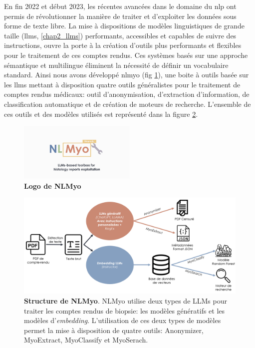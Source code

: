 En fin 2022 et début 2023, les récentes avancées dans le domaine du \gls{nlp} ont permis de révolutionner la manière de traiter et d'exploiter les données sous forme de texte libre. La mise à dispositions de modèles linguistiques de grande taille (\gls{llms}, \ref{chap2_llms}) performants, accessibles et capables de suivre des instructions, ouvre la porte à la création d'outils plus performants et flexibles pour le traitement de ces comptes rendus. Ces systèmes basés sur une approche sémantique et multilingue éliminent la nécessité de définir un vocabulaire standard. Ainsi nous avons développé \gls{nlmyo} (fig \ref{fig:nlmyo_logo}), une boite à outils basée sur les \gls{llms} mettant à disposition quatre outils généralistes pour le traitement de comptes rendus médicaux: outil d'anonymisation, d'extraction d'information, de classification automatique et de création de moteurs de recherche. L'ensemble de ces outils et des modèles utilisés est représenté dans la figure \ref{fig:nlmyo_struct}.
\begin{figure}[!ht]
 \centering
 \includegraphics[width=0.5\textwidth]{figures/nlmyo_banner.png}
 \caption[Logo NLMyo]{\textbf{Logo de NLMyo}}
 \label{fig:nlmyo_logo}
\end{figure}
\begin{figure}[!ht]
 \centering
 \includegraphics[width=1\textwidth]{figures/nlmyo_struct.png}
 \caption[Structure de NLMyo]{\textbf{Structure de NLMyo}. NLMyo utilise deux types de LLMs pour traiter les comptes rendus de biopsie: les modèles génératifs et les modèles d'\textit{embedding}. L'utilisation de ces deux types de modèles permet la mise à disposition de quatre outils: Anonymizer, MyoExtract, MyoClassify et MyoSerach.}
 \label{fig:nlmyo_struct}
\end{figure}

